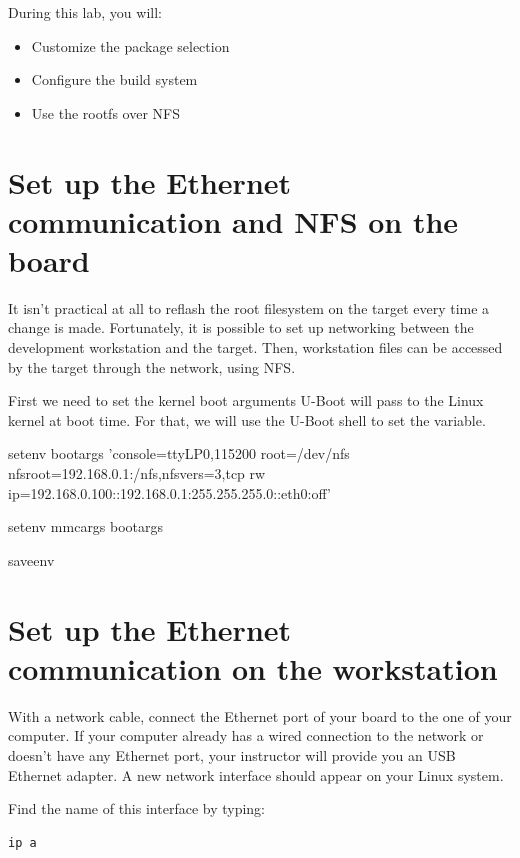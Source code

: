 
During this lab, you will:
\begin{itemize}
  \item Customize the package selection
  \item Configure the build system
  \item Use the rootfs over NFS
\end{itemize}

\section{Set up the Ethernet communication and NFS on the board}

It isn't practical at all to reflash the root filesystem on the target
every time a change is made. Fortunately, it is possible to set up
networking between the development workstation and the target. Then,
workstation files can be accessed by the target through the network,
using NFS.

First we need to set the kernel boot arguments U-Boot will pass to the
Linux kernel at boot time. For that, we will use the U-Boot shell
to set the  variable.

\begin{bashinput}
setenv bootargs 'console=ttyLP0,115200 root=/dev/nfs nfsroot=192.168.0.1:/nfs,nfsvers=3,tcp rw ip=192.168.0.100::192.168.0.1:255.255.255.0::eth0:off'

setenv mmcargs bootargs

saveenv
\end{bashinput}

\section{Set up the Ethernet communication on the workstation}

With a network cable, connect the  Ethernet port of your board to the
one of your computer. If your computer already has a wired connection
to the network or doesn't have any Ethernet port, your instructor will
provide you an USB Ethernet adapter. A new network interface should
 appear on your Linux system.

Find the name of this interface by typing:
\begin{verbatim}
ip a
\end{verbatim}

